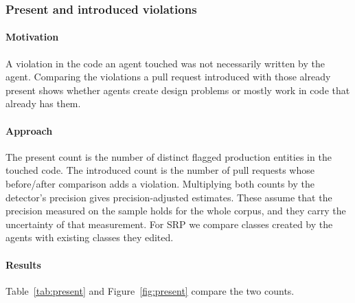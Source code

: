 \documentclass[sigconf]{acmart}
\begin{document}
\subsubsection{Present and introduced violations}
\label{sec:locus}

\paragraph{Motivation} A violation in the code an agent touched was not necessarily written by the
agent. Comparing the violations a pull request introduced with those already present shows whether
agents create design problems or mostly work in code that already has them.

\paragraph{Approach} The present count is the number of distinct flagged production entities in the
touched code. The introduced count is the number of pull requests whose before/after comparison adds
a violation. Multiplying both counts by the detector's precision gives precision-adjusted estimates.
These assume that the precision measured on the sample holds for the whole corpus, and they carry
the uncertainty of that measurement. For SRP we compare classes created by the agents with existing
classes they edited.

\paragraph{Results} Table~\ref{tab:present} and Figure~\ref{fig:present} compare the two counts.
\end{document}
